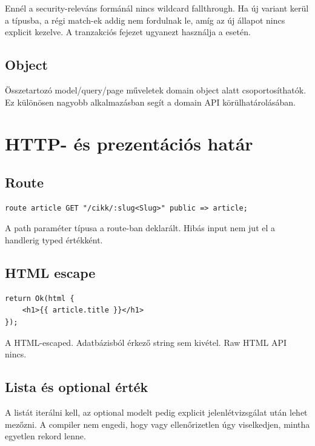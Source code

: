 Ennél a security-releváns formánál nincs wildcard fallthrough. Ha új variant kerül a típusba, a régi match-ek addig nem fordulnak le, amíg az új állapot nincs explicit kezelve. A tranzakciós fejezet ugyanezt használja a  esetén.

\subsection*{Object}

Összetartozó model/query/page műveletek domain object alatt csoportosíthatók. Ez különösen nagyobb alkalmazásban segít a domain API körülhatárolásában.


\section{HTTP- és prezentációs határ}

\subsection*{Route}

\begin{lstlisting}[language=Velran]
route article GET "/cikk/:slug<Slug>" public => article;
\end{lstlisting}

A path paraméter típusa a route-ban deklarált. Hibás input nem jut el a handlerig typed értékként.

\subsection*{HTML escape}

\begin{lstlisting}[language=Velran]
return Ok(html {
    <h1>{{ article.title }}</h1>
});
\end{lstlisting}

A  HTML-escaped. Adatbázisból érkező string sem kivétel. Raw HTML API nincs.

\subsection*{Lista és optional érték}

A listát iterálni kell, az optional modelt pedig explicit jelenlétvizsgálat után lehet mezőzni. A compiler nem engedi, hogy  vagy ellenőrizetlen  úgy viselkedjen, mintha egyetlen rekord lenne.

